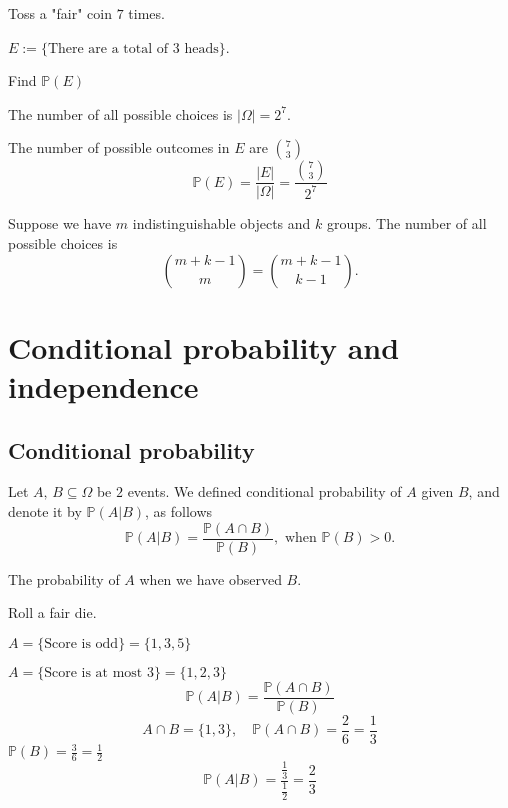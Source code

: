\documentclass[10pt, a4paper]{article}
\begin{document}
\begin{example}
    Toss a "fair" coin $7$ times.

    $E := \{\text{There are a total of $3$ heads}\}$.

    Find $\mathbb{P}(E)$

    The number of all possible choices is $|\Omega| = 2 ^ 7$.

    The number of possible outcomes in $E$ are $\binom{7}{3}$
    \[
    \mathbb{P}(E) = \frac{|E|}{|\Omega|} = \frac{\binom{7}{3}}{2 ^ 7}
    \]
\end{example}

\begin{countprinc}
    Suppose we have $m$ indistinguishable objects and $k$ groups. The number of all possible choices is
    \[
    \binom{m + k - 1}{m} = \binom{m + k - 1}{k - 1}.
    \]
\end{countprinc}

\newpage

\section{Conditional probability and independence}

\subsection{Conditional probability}

\begin{definition}
    Let $A,\, B \subseteq \Omega$ be $2$ events. We defined conditional probability of $A$ given $B$, and denote it by $\mathbb{P}(A | B)$, as follows
    \[
    \mathbb{P}(A | B) = \frac{\mathbb{P}(A \cap B)}{\mathbb{P}(B)},\text{ when } \mathbb{P}(B) > 0.
    \]
\end{definition}
The probability of $A$ when we have observed $B$.

\begin{example}
    Roll a fair die.

    $A = \{\text{Score is odd}\} = \{1, 3, 5\}$
    
    $A = \{\text{Score is at most $3$}\} = \{1, 2, 3\}$
    \[
    \mathbb{P}(A | B) = \frac{\mathbb{P}(A \cap B)}{\mathbb{P}(B)}
    \]
    \[
    A \cap B = \{1, 3\},\quad\mathbb{P}(A \cap B) = \frac{2}{6} = \frac{1}{3} 
    \]
    $\mathbb{P}(B) = \frac{3}{6} = \frac{1}{2}$
    \[
    \mathbb{P}(A | B) = \frac{\frac{1}{3}}{\frac{1}{2}} = \frac{2}{3}
    \]
\end{example}
\end{document}
